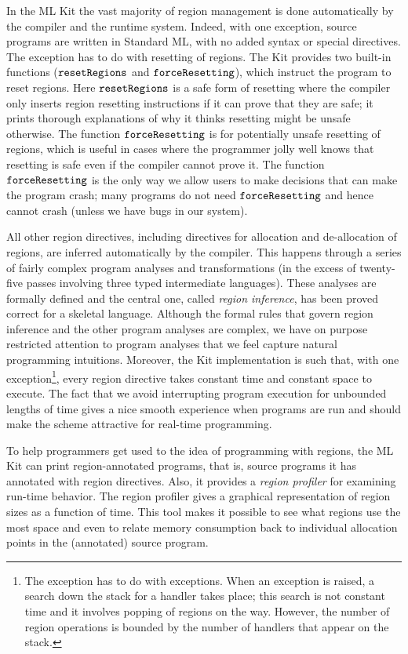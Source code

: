 \documentclass[12pt]{book}
\begin{document}
In the ML Kit the vast majority of region management is done
automatically by the compiler and the runtime system.  Indeed, with
one exception, source programs are written in Standard ML, with no
added syntax or special directives. The exception has to do with
resetting of regions. The Kit provides two built-in functions
%
%
($\hbox{\tt resetRegions}$ and $\hbox{\tt forceResetting}$), which instruct the program to reset
regions. Here $\hbox{\tt resetRegions}$ is a safe form of resetting where the compiler
only inserts region resetting instructions if it can prove that they
are safe; it prints thorough explanations of why it thinks resetting
might be unsafe otherwise. The function $\hbox{\tt forceResetting}$ is for potentially
unsafe resetting of regions, which is useful in cases where the
programmer jolly well knows that resetting is safe even if the
compiler cannot prove it. The function $\hbox{\tt forceResetting}$ is the only way we
allow users to make decisions that can make the program crash; many
programs do not need $\hbox{\tt forceResetting}$ and hence cannot crash (unless we have
bugs in our system).

All other region directives, including directives for allocation and
de-allocation of regions, are inferred automatically by the compiler.
This happens through a series of fairly complex program analyses and
transformations (in the excess of twenty-five passes involving three
typed intermediate languages). These analyses are formally defined and
the central one, called
%
{\em region inference}, has been proved correct for a skeletal
language. Although the formal rules that govern region inference and
the other program analyses are complex, we have on purpose restricted
attention to program analyses that we feel capture natural programming
intuitions.  Moreover, the Kit implementation is such that, with one
exception\footnote{The exception has to do with exceptions. When an
  exception is raised, a search down the stack for a handler takes
  place; this search is not constant time and it involves popping of
  regions on the way. However, the number of region operations is
  bounded by the number of handlers that appear on the stack.}, every
region directive takes constant time and constant space to execute.
The fact that we avoid interrupting program execution for unbounded
lengths of time gives a nice smooth experience when programs are run
and should make the scheme attractive for real-time programming.

To help programmers get used to the idea of programming with regions,
the ML Kit can print region-annotated programs, that is, source programs
it has annotated with region directives. Also, it provides a 
%
{\em region profiler\/} for examining run-time behavior.  The region
profiler gives a graphical representation of region sizes as a
function of time. This tool makes it possible to see what regions use
the most space and even to relate memory consumption back to
individual allocation points in the (annotated) source program.
\end{document}
